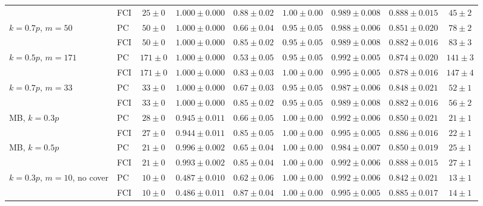 \begin{tabular}{llccccccc}
 & FCI & $25\pm0$ & $1.000\pm0.000$ & $0.88\pm0.02$ & $1.00\pm0.00$ & $0.989\pm0.008$ & $0.888\pm0.015$ & $45\pm2$ \\
$k{=}0.7p$, $m{=}50$ & PC & $50\pm0$ & $1.000\pm0.000$ & $0.66\pm0.04$ & $0.95\pm0.05$ & $0.988\pm0.006$ & $0.851\pm0.020$ & $78\pm2$ \\
 & FCI & $50\pm0$ & $1.000\pm0.000$ & $0.85\pm0.02$ & $0.95\pm0.05$ & $0.989\pm0.008$ & $0.882\pm0.016$ & $83\pm3$ \\
$k{=}0.5p$, $m{=}171$ & PC & $171\pm0$ & $1.000\pm0.000$ & $0.53\pm0.05$ & $0.95\pm0.05$ & $0.992\pm0.005$ & $0.874\pm0.020$ & $141\pm3$ \\
 & FCI & $171\pm0$ & $1.000\pm0.000$ & $0.83\pm0.03$ & $1.00\pm0.00$ & $0.995\pm0.005$ & $0.878\pm0.016$ & $147\pm4$ \\
$k{=}0.7p$, $m{=}33$ & PC & $33\pm0$ & $1.000\pm0.000$ & $0.67\pm0.03$ & $0.95\pm0.05$ & $0.987\pm0.006$ & $0.848\pm0.021$ & $52\pm1$ \\
 & FCI & $33\pm0$ & $1.000\pm0.000$ & $0.85\pm0.02$ & $0.95\pm0.05$ & $0.989\pm0.008$ & $0.882\pm0.016$ & $56\pm2$ \\
MB, $k{=}0.3p$ & PC & $28\pm0$ & $0.945\pm0.011$ & $0.66\pm0.05$ & $1.00\pm0.00$ & $0.992\pm0.006$ & $0.850\pm0.021$ & $21\pm1$ \\
 & FCI & $27\pm0$ & $0.944\pm0.011$ & $0.85\pm0.05$ & $1.00\pm0.00$ & $0.995\pm0.005$ & $0.886\pm0.016$ & $22\pm1$ \\
MB, $k{=}0.5p$ & PC & $21\pm0$ & $0.996\pm0.002$ & $0.65\pm0.04$ & $1.00\pm0.00$ & $0.984\pm0.007$ & $0.850\pm0.019$ & $25\pm1$ \\
 & FCI & $21\pm0$ & $0.993\pm0.002$ & $0.85\pm0.04$ & $1.00\pm0.00$ & $0.992\pm0.006$ & $0.888\pm0.015$ & $27\pm1$ \\
$k{=}0.3p$, $m{=}10$, no cover & PC & $10\pm0$ & $0.487\pm0.010$ & $0.62\pm0.06$ & $1.00\pm0.00$ & $0.992\pm0.006$ & $0.842\pm0.021$ & $13\pm1$ \\
 & FCI & $10\pm0$ & $0.486\pm0.011$ & $0.87\pm0.04$ & $1.00\pm0.00$ & $0.995\pm0.005$ & $0.885\pm0.017$ & $14\pm1$ \\
\bottomrule
\end{tabular}
